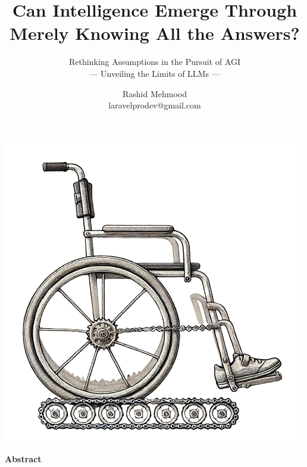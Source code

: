 \documentclass[11pt]{scrartcl}
\begin{document}
\title{Can Intelligence Emerge Through Merely Knowing All the Answers?}
\subtitle{Rethinking Assumptions in the Pursuit of AGI \\ — Unveiling the Limits of LLMs —}
\author{Rashid Mehmood \\ laravelprodev@gmail.com}

\maketitle

\includegraphics[scale=0.6, center]{title_wheelchair.png}

\vspace{2cm}

\begin{center}
\begin{Huge}
\textbf{Abstract}
\end{Huge}
\end{center}
\end{document}
